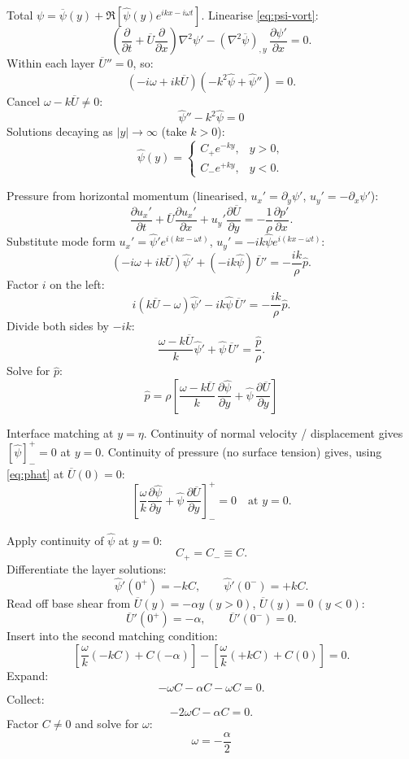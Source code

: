 \documentclass[11pt]{article}
\newcommand{\pd}[2]{\frac{\partial #1}{\partial #2}}
\newcommand{\Lap}{\nabla^{2}}
\begin{document}
Total $\psi=\overline\psi(y)+\Re[\hat\psi(y)e^{ikx-i\omega t}]$. Linearise \eqref{eq:psi-vort}:
\[
\left(\pd{}{t}+\overline U\pd{}{x}\right)\Lap\psi'-(\Lap\overline\psi)_{,y}\,\pd{\psi'}{x}=0.
\]
Within each layer $\overline U''=0$, so:
\[
(-i\omega+ik\overline U)(-k^2\hat\psi+\hat\psi'')=0.
\]
Cancel $\omega-k\overline U\ne 0$:
\begin{equation}
\boxed{\;\hat\psi''-k^2\hat\psi=0\;}
\label{eq:psihat-ode}
\end{equation}
Solutions decaying as $|y|\to\infty$ (take $k>0$):
\[
\hat\psi(y)=\begin{cases}C_+ e^{-ky},& y>0,\\ C_- e^{+ky},& y<0.\end{cases}
\]

Pressure from horizontal momentum (linearised, $u_x'=\partial_y\psi'$, $u_y'=-\partial_x\psi'$):
\[
\pd{u_x'}{t}+\overline U\pd{u_x'}{x}+u_y'\pd{\overline U}{y}=-\frac{1}{\rho}\pd{p'}{x}.
\]
Substitute mode form $u_x'=\hat\psi' e^{i(kx-\omega t)}$, $u_y'=-ik\hat\psi e^{i(kx-\omega t)}$:
\[
(-i\omega+ik\overline U)\hat\psi'+(-ik\hat\psi)\,\overline U'=-\frac{ik}{\rho}\hat p.
\]
Factor $i$ on the left:
\[
i(k\overline U-\omega)\hat\psi'-ik\hat\psi\,\overline U'=-\frac{ik}{\rho}\hat p.
\]
Divide both sides by $-ik$:
\[
\frac{\omega-k\overline U}{k}\hat\psi'+\hat\psi\,\overline U'=\frac{\hat p}{\rho}.
\]
Solve for $\hat p$:
\begin{equation}
\boxed{\;\hat p=\rho\!\left[\frac{\omega-k\overline U}{k}\,\pd{\hat\psi}{y}+\hat\psi\,\pd{\overline U}{y}\right]\;}
\label{eq:phat}
\end{equation}

Interface matching at $y=\eta$. Continuity of normal velocity / displacement gives $[\hat\psi]_-^+=0$ at $y=0$. Continuity of pressure (no surface tension) gives, using \eqref{eq:phat} at $\overline U(0)=0$:
\[
\left[\frac{\omega}{k}\pd{\hat\psi}{y}+\hat\psi\,\pd{\overline U}{y}\right]_-^+=0\quad\text{at }y=0.
\]

Apply continuity of $\hat\psi$ at $y=0$:
\[
C_+=C_-\equiv C.
\]
Differentiate the layer solutions:
\[
\hat\psi'(0^+)=-kC,\qquad \hat\psi'(0^-)=+kC.
\]
Read off base shear from $\overline U(y)=-\alpha y\,(y>0)$, $\overline U(y)=0\,(y<0)$:
\[
\overline U'(0^+)=-\alpha,\qquad \overline U'(0^-)=0.
\]
Insert into the second matching condition:
\[
\left[\frac{\omega}{k}(-kC)+C(-\alpha)\right]-\left[\frac{\omega}{k}(+kC)+C(0)\right]=0.
\]
Expand:
\[
-\omega C-\alpha C-\omega C=0.
\]
Collect:
\[
-2\omega C-\alpha C=0.
\]
Factor $C\ne 0$ and solve for $\omega$:
\begin{equation}
\boxed{\;\omega=-\frac{\alpha}{2}\;}
\label{eq:omega-result}
\end{equation}
\end{document}
